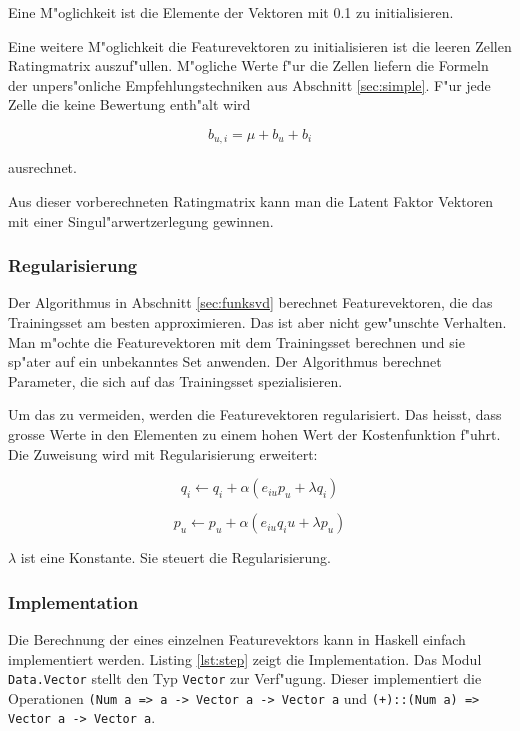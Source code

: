 \documentclass[a4paper, 12pt]{article}
\begin{document}
Eine M"oglichkeit ist die Elemente der Vektoren mit 0.1 zu initialisieren. 

Eine weitere M"oglichkeit die Featurevektoren zu initialisieren ist die leeren Zellen Ratingmatrix auszuf"ullen. M"ogliche Werte f"ur die Zellen liefern die Formeln der unpers"onliche Empfehlungstechniken aus Abschnitt \ref{sec:simple}. F"ur jede Zelle die keine Bewertung enth"alt wird 

\begin{equation}
  \label{eq:mu2}
    b_{u,i} = \mu + b_u + b_i
\end{equation}

ausrechnet.

Aus dieser vorberechneten Ratingmatrix kann man die Latent Faktor Vektoren mit einer Singul"arwertzerlegung gewinnen.

\subsubsection{Regularisierung}
\label{sec:regularization}

Der Algorithmus in Abschnitt \ref{sec:funksvd} berechnet Featurevektoren, die das Trainingsset am besten approximieren. Das ist aber nicht gew"unschte Verhalten. Man m"ochte die Featurevektoren mit dem Trainingsset berechnen und sie sp"ater auf ein unbekanntes Set anwenden. Der Algorithmus berechnet Parameter, die sich auf das Trainingsset spezialisieren. 

Um das zu vermeiden, werden die Featurevektoren regularisiert. Das heisst, dass grosse Werte in den Elementen zu einem hohen Wert der Kostenfunktion f"uhrt. Die Zuweisung wird mit Regularisierung erweitert:

\begin{equation}
  \label{eq:assign2}
  q_i \leftarrow q_i + \alpha (e_{iu} p_u + \lambda q_i)
\end{equation}

\begin{equation}
  \label{eq:assign3}
    p_u \leftarrow p_u + \alpha (e_{iu} q_iu + \lambda p_u)
\end{equation}

$\lambda$ ist eine Konstante. Sie steuert die Regularisierung.

\subsubsection{Implementation}
\label{sec:sgdimpl}

Die Berechnung der eines einzelnen Featurevektors kann in Haskell einfach implementiert werden. Listing \ref{lst:step} zeigt die Implementation. Das Modul \verb|Data.Vector| stellt den Typ \verb|Vector| zur Verf"ugung. Dieser implementiert die Operationen \verb|(Num a => a -> Vector a -> Vector a| und \verb|(+)::(Num a) => Vector a -> Vector a|.
\end{document}
